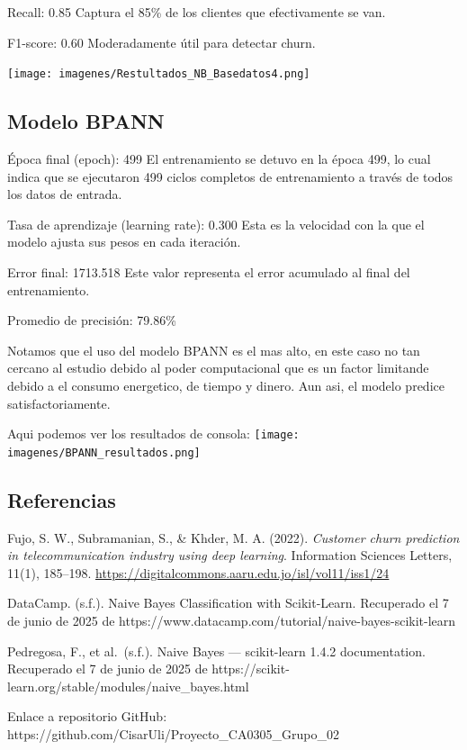 \documentclass[
  letterpaper,
  DIV=11,
  numbers=noendperiod]{scrartcl}
\begin{document}
Recall: 0.85 Captura el 85\% de los clientes que efectivamente se van.

F1-score: 0.60 Moderadamente útil para detectar churn.

\texttt{[image: imagenes/Restultados\_NB\_Basedatos4.png]}

\subsection{Modelo BPANN}\label{modelo-bpann}

Época final (epoch): 499 El entrenamiento se detuvo en la época 499, lo
cual indica que se ejecutaron 499 ciclos completos de entrenamiento a
través de todos los datos de entrada.

Tasa de aprendizaje (learning rate): 0.300 Esta es la velocidad con la
que el modelo ajusta sus pesos en cada iteración.

Error final: 1713.518 Este valor representa el error acumulado al final
del entrenamiento.

Promedio de precisión: 79.86\%

Notamos que el uso del modelo BPANN es el mas alto, en este caso no tan
cercano al estudio debido al poder computacional que es un factor
limitande debido a el consumo energetico, de tiempo y dinero. Aun asi,
el modelo predice satisfactoriamente.

Aqui podemos ver los resultados de consola:
\texttt{[image: imagenes/BPANN\_resultados.png]}

\subsection{Referencias}\label{referencias}

Fujo, S. W., Subramanian, S., \& Khder, M. A. (2022). \emph{Customer
churn prediction in telecommunication industry using deep learning}.
Information Sciences Letters, 11(1), 185--198.
\url{https://digitalcommons.aaru.edu.jo/isl/vol11/iss1/24}

DataCamp. (s.f.). Naive Bayes Classification with Scikit-Learn.
Recuperado el 7 de junio de 2025 de
https://www.datacamp.com/tutorial/naive-bayes-scikit-learn

Pedregosa, F., et al.~(s.f.). Naive Bayes --- scikit-learn 1.4.2
documentation. Recuperado el 7 de junio de 2025 de
https://scikit-learn.org/stable/modules/naive\_bayes.html

Enlace a repositorio GitHub:
https://github.com/CisarUli/Proyecto\_CA0305\_Grupo\_02
\end{document}
